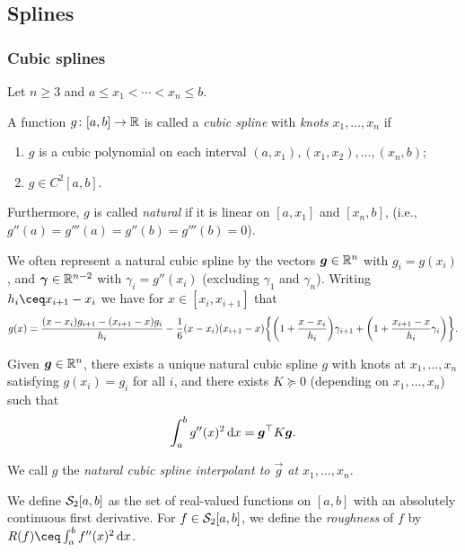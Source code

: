 
\subsection{Splines}
\subsubsection{Cubic splines}
Let $n \geq 3$ and $a \leq x_1 < \dotsb < x_n \leq b$.  
\begin{definition}
	A function $g \colon [a, b] \to \mathbb R$ is called a \emph{cubic spline} with \emph{knots} $x_1, \dotsc, x_n$ if 
	\begin{enumerate}
		\item $g$ is a cubic polynomial on each interval $(a, x_1), (x_1, x_2), \dotsc, (x_n, b)$;
		\item $g \in C^2[a, b]$. 
	\end{enumerate}
	Furthermore, $g$ is called \emph{natural} if it is linear on $[a, x_1]$ and $[x_n, b]$, (i.e., $g''(a) = g'''(a) = g''(b) = g'''(b) = 0$). 
\end{definition}

We often represent a natural cubic spline by the vectors $\boldsymbol g \in \mathbb R^n$ with $g_i = g(x_i)$, and $\boldsymbol \gamma \in \mathbb R^{n-2}$ with $\gamma_i = g''(x_i)$ (excluding $\gamma_1$ and $\gamma_n$). Writing $h_i \ceq x_{i+1} - x_i$ we have for $x \in [x_i, x_{i+1}]$ that
\[
g(x) = \frac{(x - x_i) g_{i+1} - (x_{i+1} - x) g_i}{h_i} - \frac16(x - x_i)(x_{i+1} - x) \qty{\qty(1 + \frac{x - x_i}{h_i})\gamma_{i+1} + \qty(1 + \frac{x_{i+1} - x}{h_i}\gamma_i)}.
\]
\begin{proposition}
	Given $\boldsymbol g \in \mathbb R^n$, there exists a unique natural cubic spline $g$ with knots at $x_1, \dotsc, x_n$ satisfying $g(x_i) = g_i$ for all $i$, and there exists $K \succeq 0$ (depending on $x_1, \dotsc, x_n$) such that
	\[
	\int_a^b g''(x)^2 \dd{x} = \boldsymbol g^\top K \boldsymbol g. 
	\]
\end{proposition}
We call $g$ the \emph{natural cubic spline interpolant to $\vec g$ at $x_1, \dotsc, x_n$}. 

\begin{definition}
	We define $\mathcal S_2[a, b]$ as the set of real-valued functions on $[a, b]$ with an absolutely continuous first derivative. For $f \in \mathcal S_2[a, b]$, we define the \emph{roughness} of $f$ by $R(f) \ceq \int_a^b f''(x)^2 \dd{x}$. 
\end{definition}

